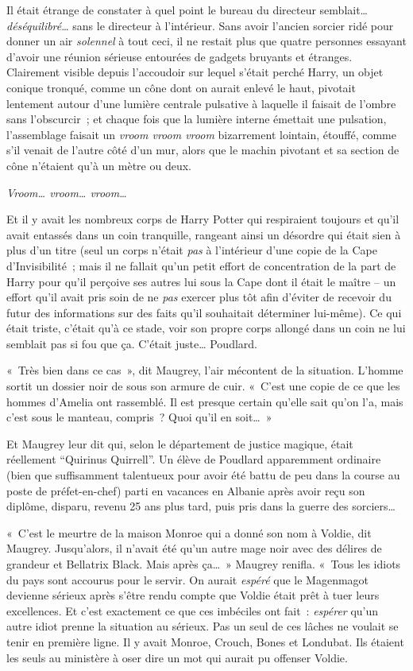 Il était étrange de constater à quel point le bureau du directeur semblait… \emph{déséquilibré}… sans le directeur à l'intérieur. Sans avoir l'ancien sorcier ridé pour donner un air \emph{solennel} à tout ceci, il ne restait plus que quatre personnes essayant d'avoir une réunion sérieuse entourées de gadgets bruyants et étranges. Clairement visible depuis l'accoudoir sur lequel s'était perché Harry, un objet conique tronqué, comme un cône dont on aurait enlevé le haut, pivotait lentement autour d'une lumière centrale pulsative à laquelle il faisait de l'ombre sans l'obscurcir~; et chaque fois que la lumière interne émettait une pulsation, l'assemblage faisait un \emph{vroom vroom vroom} bizarrement lointain, étouffé, comme s'il venait de l'autre côté d'un mur, alors que le machin pivotant et sa section de cône n'étaient qu'à un mètre ou deux.

\emph{Vroom… vroom… vroom…}

Et il y avait les nombreux corps de Harry Potter qui respiraient toujours et qu'il avait entassés dans un coin tranquille, rangeant ainsi un désordre qui était sien à plus d'un titre (seul un corps n'était \emph{pas} à l'intérieur d'une copie de la Cape d'Invisibilité~; mais il ne fallait qu'un petit effort de concentration de la part de Harry pour qu'il perçoive ses autres lui sous la Cape dont il était le maître -- un effort qu'il avait pris soin de ne \emph{pas} exercer plus tôt afin d'éviter de recevoir du futur des informations sur des faits qu'il souhaitait déterminer lui-même). Ce qui était triste, c'était qu'à ce stade, voir son propre corps allongé dans un coin ne lui semblait pas si fou que ça. C'était juste… Poudlard.

«~Très bien dans ce cas~», dit Maugrey, l'air mécontent de la situation. L'homme sortit un dossier noir de sous son armure de cuir. «~C'est une copie de ce que les hommes d'Amelia ont rassemblé. Il est presque certain qu'elle sait qu'on l'a, mais c'est sous le manteau, compris~? Quoi qu'il en soit…~»

Et Maugrey leur dit qui, selon le département de justice magique, était réellement “Quirinus Quirrell”. Un élève de Poudlard apparemment ordinaire (bien que suffisamment talentueux pour avoir été battu de peu dans la course au poste de préfet-en-chef) parti en vacances en Albanie après avoir reçu son diplôme, disparu, revenu 25 ans plus tard, puis pris dans la guerre des sorciers…

«~C'est le meurtre de la maison Monroe qui a donné son nom à Voldie, dit Maugrey. Jusqu'alors, il n'avait été qu'un autre mage noir avec des délires de grandeur et Bellatrix Black. Mais après ça…~» Maugrey renifla. «~Tous les idiots du pays sont accourus pour le servir. On aurait \emph{espéré} que le Magenmagot devienne sérieux après s'être rendu compte que Voldie était prêt à tuer leurs excellences. Et c'est exactement ce que ces imbéciles ont fait~: \emph{espérer} qu'un autre idiot prenne la situation au sérieux. Pas un seul de ces lâches ne voulait se tenir en première ligne. Il y avait Monroe, Crouch, Bones et Londubat. Ils étaient les seuls au ministère à oser dire un mot qui aurait pu offenser Voldie.

